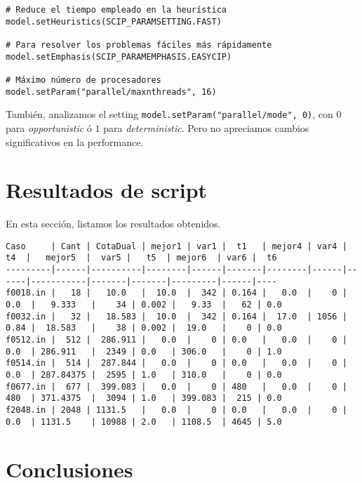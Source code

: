 \documentclass[11pt, a4paper, pdftex]{article}
\begin{document}
\begin{verbatim}
# Reduce el tiempo empleado en la heurística
model.setHeuristics(SCIP_PARAMSETTING.FAST)

# Para resolver los problemas fáciles más rápidamente
model.setEmphasis(SCIP_PARAMEMPHASIS.EASYCIP)

# Máximo número de procesadores
model.setParam("parallel/maxnthreads", 16)
\end{verbatim}

También, analizamos el setting \verb|model.setParam("parallel/mode", 0)|,
con $0$ para \emph{opportunistic} ó $1$ para \emph{deterministic}.
Pero no apreciamos cambios significativos en la performance.

\section{Resultados de script}

En esta sección, listamos los resultados obtenidos.

\newpage

\begin{turn}{90}
\begin{minipage}{\textheight}
\begin{verbatim}
Caso     | Cant | CotaDual | mejor1 | var1 |  t1   | mejor4 | var4 |  t4  |   mejor5  |  var5 |   t5  | mejor6  | var6 |  t6
---------|------|----------|--------|------|-------|--------|------|------|-----------|-------|-------|---------|------|----
f0018.in |   18 |   10.0   |  10.0  |  342 | 0.164 |   0.0  |    0 | 0.0  |   9.333   |    34 | 0.002 |   9.33  |   62 | 0.0
f0032.in |   32 |   18.583 |  10.0  |  342 | 0.164 |  17.0  | 1056 | 0.84 |  18.583   |    38 | 0.002 |  19.0   |    0 | 0.0
f0512.in |  512 |  286.911 |   0.0  |    0 | 0.0   |   0.0  |    0 | 0.0  | 286.911   |  2349 | 0.0   | 306.0   |    0 | 1.0
f0514.in |  514 |  287.844 |   0.0  |    0 | 0.0   |   0.0  |    0 | 0.0  | 287.84375 |  2595 | 1.0   | 310.0   |    0 | 0.0
f0677.in |  677 |  399.083 |   0.0  |    0 | 480   |   0.0  |    0 | 480  | 371.4375  |  3094 | 1.0   | 399.083 |  215 | 0.0
f2048.in | 2048 | 1131.5   |   0.0  |    0 | 0.0   |   0.0  |    0 | 0.0  | 1131.5    | 10988 | 2.0   | 1108.5  | 4645 | 5.0
\end{verbatim}
\end{minipage}
\end{turn}

\newpage
\section{Conclusiones}
\end{document}
